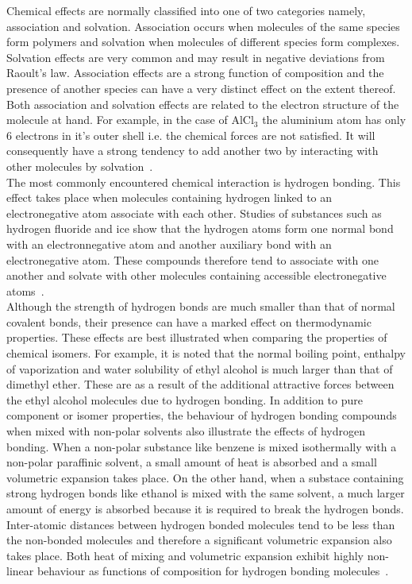 Chemical effects are normally classified into one of two categories namely, association and solvation. Association occurs when molecules of the same species form polymers and solvation when molecules of different species form complexes. Solvation effects are very common and may result in negative deviations from Raoult's law. Association effects are a strong function of composition and the presence of another species can have a very distinct effect on the extent thereof. Both association and solvation effects are related to the electron structure of the molecule at hand. For example, in the case of $\mathrm{AlCl_{3}}$ the aluminium atom has only 6 electrons in it's outer shell i.e. the chemical forces are not satisfied. It will consequently have a strong tendency to add another two by interacting with other molecules by solvation~\cite{MolecularThermodynamicsOfFluidPhaseEquilibria}.\\

The most commonly encountered chemical interaction is hydrogen bonding. This effect takes place when molecules containing hydrogen linked to an electronegative atom associate with each other. Studies of substances such as hydrogen fluoride and ice show that the hydrogen atoms form one normal bond with an electronnegative atom and another auxiliary bond with an electronegative atom. These compounds therefore tend to associate with one another and solvate with other molecules containing accessible electronegative atoms~\cite{MolecularThermodynamicsOfFluidPhaseEquilibria}.\\

Although the strength of hydrogen bonds are much smaller than that of normal covalent bonds, their presence can have a marked effect on thermodynamic properties. These effects are best illustrated when comparing the properties of chemical isomers. For example, it is noted that the normal boiling point, enthalpy of vaporization and water solubility of ethyl alcohol is much larger than that of dimethyl ether. These are as a result of the additional attractive forces between the ethyl alcohol molecules due to hydrogen bonding. In addition to pure component or isomer properties, the behaviour of hydrogen bonding compounds when mixed with non-polar solvents also illustrate the effects of hydrogen bonding. When a non-polar substance like benzene is mixed isothermally with a non-polar paraffinic solvent, a small amount of heat is absorbed and a small volumetric expansion takes place. On the other hand, when a substace containing strong hydrogen bonds like ethanol is mixed with the same solvent, a much larger amount of energy is absorbed because it is required to break the hydrogen bonds. Inter-atomic distances between hydrogen bonded molecules tend to be less than the non-bonded molecules and therefore a significant volumetric expansion also takes place. Both heat of mixing and volumetric expansion exhibit highly non-linear behaviour as functions of composition for hydrogen bonding molecules~\cite{MolecularThermodynamicsOfFluidPhaseEquilibria}.\\

